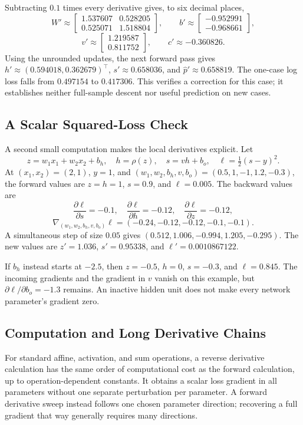 Subtracting $0.1$ times every derivative gives, to six decimal places,
\[
W'\approx\begin{bmatrix}1.537607&0.528205\\0.525071&1.518804\end{bmatrix},
\qquad b'\approx\begin{bmatrix}-0.952991\\-0.968661\end{bmatrix},
\]
\[
v'\approx\begin{bmatrix}1.219587\\0.811752\end{bmatrix},
\qquad c'\approx-0.360826.
\]
Using the unrounded updates, the next forward pass gives $h'\approx(0.594018,0.362679)^\top$, $s'\approx0.658036$, and $\hat p'\approx0.658819$. The one-case log loss falls from $0.497154$ to $0.417306$. This verifies a correction for this case; it establishes neither full-sample descent nor useful prediction on new cases.

\subsection{A Scalar Squared-Loss Check}

A second small computation makes the local derivatives explicit. Let
\[
z=w_1x_1+w_2x_2+b_h,
\quad h=\rho(z),\quad s=vh+b_o,
\quad \ell=\tfrac12(s-y)^2.
\]
At $(x_1,x_2)=(2,1)$, $y=1$, and $(w_1,w_2,b_h,v,b_o)=(0.5,1,-1,1.2,-0.3)$, the forward values are $z=h=1$, $s=0.9$, and $\ell=0.005$. The backward values are
\[
\frac{\partial\ell}{\partial s}=-0.1,
\quad\frac{\partial\ell}{\partial h}=-0.12,
\quad\frac{\partial\ell}{\partial z}=-0.12,
\]
\[
\nabla_{(w_1,w_2,b_h,v,b_o)}\ell=(-0.24,-0.12,-0.12,-0.1,-0.1).
\]
A simultaneous step of size $0.05$ gives $(0.512,1.006,-0.994,1.205,-0.295)$. The new values are $z'=1.036$, $s'=0.95338$, and $\ell'=0.0010867122$.

If $b_h$ instead starts at $-2.5$, then $z=-0.5$, $h=0$, $s=-0.3$, and $\ell=0.845$. The incoming gradients and the gradient in $v$ vanish on this example, but $\partial\ell/\partial b_o=-1.3$ remains. An inactive hidden unit does not make every network parameter's gradient zero.

\subsection{Computation and Long Derivative Chains}

For standard affine, activation, and sum operations, a reverse derivative calculation has the same order of computational cost as the forward calculation, up to operation-dependent constants. It obtains a scalar loss gradient in all parameters without one separate perturbation per parameter. A forward derivative sweep instead follows one chosen parameter direction; recovering a full gradient that way generally requires many directions.

